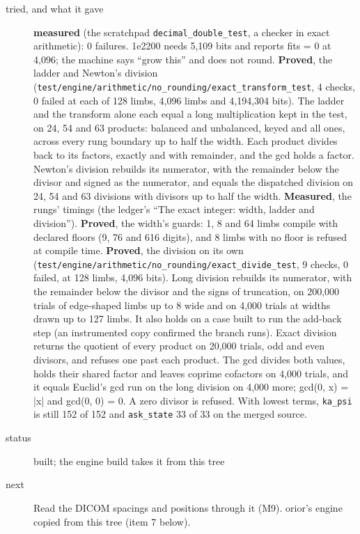\begin{description}
\item[{tried, and what it gave}] \textbf{measured} (the scratchpad \texttt{decimal\_\allowbreak{}double\_\allowbreak{}test}, a checker in exact arithmetic): 0 failures. 1e2200 needs 5,109 bits and reports fits = 0 at 4,096; the machine says “grow this” and does not round. \textbf{Proved}, the ladder and Newton's division (\texttt{test/\allowbreak{}engine/\allowbreak{}arithmetic/\allowbreak{}no\_\allowbreak{}rounding/\allowbreak{}exact\_\allowbreak{}transform\_\allowbreak{}test}, 4 checks, 0 failed at each of 128 limbs, 4,096 limbs and 4,194,304 bits). The ladder and the transform alone each equal a long multiplication kept in the test, on 24, 54 and 63 products: balanced and unbalanced, keyed and all ones, across every rung boundary up to half the width. Each product divides back to its factors, exactly and with remainder, and the gcd holds a factor. Newton's division rebuilds its numerator, with the remainder below the divisor and signed as the numerator, and equals the dispatched division on 24, 54 and 63 divisions with divisors up to half the width. \textbf{Measured}, the rungs' timings (the ledger's “The exact integer: width, ladder and division”). \textbf{Proved}, the width's guards: 1, 8 and 64 limbs compile with declared floors (9, 76 and 616 digits), and 8 limbs with no floor is refused at compile time. \textbf{Proved}, the division on its own (\texttt{test/\allowbreak{}engine/\allowbreak{}arithmetic/\allowbreak{}no\_\allowbreak{}rounding/\allowbreak{}exact\_\allowbreak{}divide\_\allowbreak{}test}, 9 checks, 0 failed, at 128 limbs, 4,096 bits). Long division rebuilds its numerator, with the remainder below the divisor and the signs of truncation, on 200,000 trials of edge-shaped limbs up to 8 wide and on 4,000 trials at widths drawn up to 127 limbs. It also holds on a case built to run the add-back step (an instrumented copy confirmed the branch runs). Exact division returns the quotient of every product on 20,000 trials, odd and even divisors, and refuses one past each product. The gcd divides both values, holds their shared factor and leaves coprime cofactors on 4,000 trials, and it equals Euclid's gcd run on the long division on 4,000 more; gcd(0, x) = |x| and gcd(0, 0) = 0. A zero divisor is refused. With lowest terms, \texttt{ka\_\allowbreak{}psi} is still 152 of 152 and \texttt{ask\_\allowbreak{}state} 33 of 33 on the merged source.
\item[{status}] built; the engine build takes it from this tree
\item[{next}] Read the DICOM spacings and positions through it (M9). orior's engine copied from this tree (item 7 below).
\end{description}

